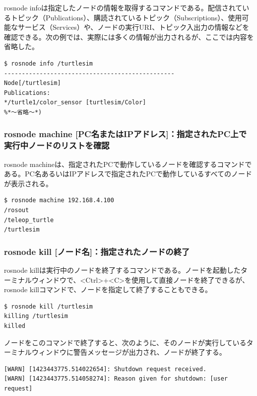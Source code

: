 rosnode infoは指定したノードの情報を取得するコマンドである。配信されているトピック（Publications）、購読されているトピック（Subscriptions）、使用可能なサービス（Services）や、ノードの実行URI、トピック入出力の情報などを確認できる。次の例では、実際には多くの情報が出力されるが、ここでは内容を省略した。

\begin{lstlisting}[language=ROS]
$ rosnode info /turtlesim
------------------------------------------------
Node[/turtlesim]
Publications:
*/turtle1/color_sensor [turtlesim/Color]
%*〜省略〜*)
\end{lstlisting}

\subsubsection{rosnode machine [PC名またはIPアドレス]：指定されたPC上で実行中ノードのリストを確認}

rosnode machineは、指定されたPCで動作しているノードを確認するコマンドである。PC名あるいはIPアドレスで指定されたPCで動作しているすべてのノードが表示される。

\begin{lstlisting}[language=ROS]
$ rosnode machine 192.168.4.100
/rosout
/teleop_turtle
/turtlesim
\end{lstlisting}

\subsubsection{rosnode kill [ノード名]：指定されたノードの終了}

rosnode killは実行中のノードを終了するコマンドである。ノードを起動したターミナルウィンドウで、<Ctrl>+<C>を使用して直接ノードを終了できるが、rosnode killコマンドで、ノードを指定して終了することもできる。

\begin{lstlisting}[language=ROS]
$ rosnode kill /turtlesim
killing /turtlesim
killed
\end{lstlisting}

ノードをこのコマンドで終了すると、次のように、そのノードが実行しているターミナルウィンドウに警告メッセージが出力され、ノードが終了する。

\begin{lstlisting}[language=ROS]
[WARN] [1423443775.514022654]: Shutdown request received.
[WARN] [1423443775.514058274]: Reason given for shutdown: [user request]
\end{lstlisting}

